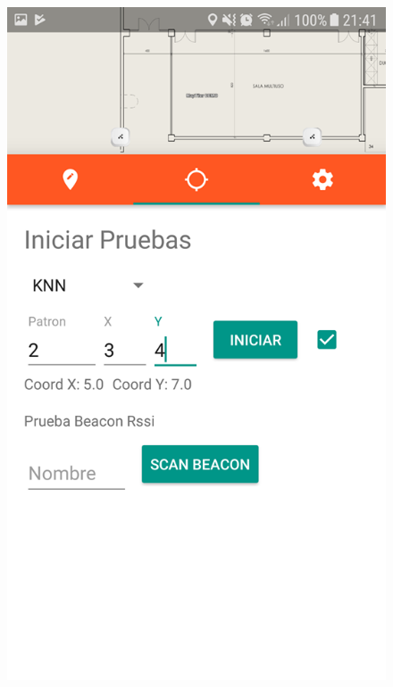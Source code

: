 \documentclass[mathserif]{beamer}
\begin{document}
\begin{frame}
\begin{columns}[t]
\begin{figure}
\includegraphics[width=\textwidth]{../figures/fase_online2.png}
\end{figure}


\end{columns}
\end{frame}
\end{document}

